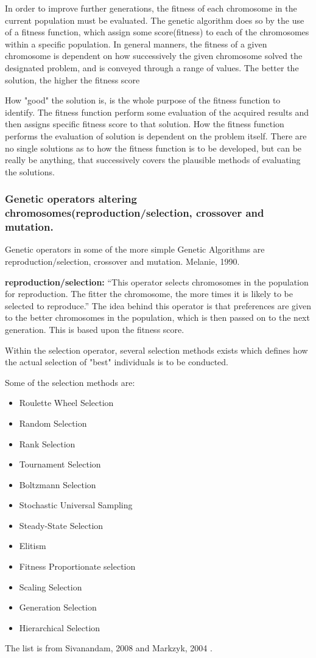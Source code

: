 In order to improve further generations, the fitness of each chromosome in the current population must be evaluated. The genetic algorithm does so by the use of a fitness function, which assign some score(fitness) to each of the chromosomes within a specific population.
In general manners, the fitness of a given chromosome is dependent on how successively the given chromosome solved the designated problem, and is conveyed through a range of values. The better the solution, the higher the fitness score \cite[pp. 8]{Melanie1990}

How "good" the solution is, is the whole purpose of the fitness function to identify. The fitness function perform some evaluation of the acquired results and then assigns specific fitness score to that solution. How the fitness function performs the evaluation of solution is dependent on the problem itself. There are no single solutions as to how the fitness function is to be developed, but can be really be anything, that successively covers the plausible methods of evaluating the solutions. \cite[pp. 31]{Sivanandam2008}

\subsubsection*{Genetic operators altering chromosomes(reproduction/selection, crossover and mutation.}


Genetic operators in some of the more simple Genetic Algorithms are reproduction/selection, crossover and mutation. Melanie, 1990. \cite{Melanie1990}

\textbf{reproduction/selection:} \enquote{This operator selects chromosomes in the population for reproduction. The fitter the chromosome, the more times it is likely to be selected to reproduce.} \cite[pp. 8]{Melanie1990}
The idea behind this operator is that preferences are given to the better chromosomes in the population, which is then passed on to the next generation. This is based upon the fitness score.

Within the selection operator, several selection methods exists which defines how the actual selection of "best" individuals is to be conducted.

Some of the selection methods are:
\begin{itemize}
\item Roulette Wheel Selection
\item Random Selection
\item Rank Selection
\item Tournament Selection
\item Boltzmann Selection
\item Stochastic Universal Sampling
\item Steady-State Selection
\item Elitism
\item Fitness Proportionate selection
\item Scaling Selection
\item Generation Selection
\item Hierarchical Selection
\end{itemize}
The list is from Sivanandam, 2008 \cite[pp. 46-50]{Sivanandam2008} and Markzyk, 2004 \cite{Adam2004}.

